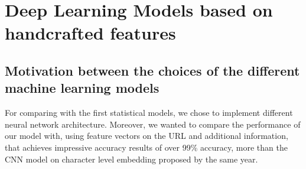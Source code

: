 \documentclass{article}
\begin{document}


    \section{Deep Learning Models based on handcrafted features}\label{sec:deep-learning-models}

    \subsection{Motivation between the choices of the different machine learning models}\label{subsec:motivation-between-the-choices-of-the-different-machine-learning-models}
    For comparing with the first statistical models, we chose to implement different neural network architecture.
    Moreover, we wanted to compare the performance of our model with\cite{EfficientDeepLearningPhishingDetection}, using feature vectors on the URL and additional information, that achieves impressive accuracy results of over 99\% accuracy, more than the CNN model on character level embedding proposed by\cite{CharacterLevelCNN} the same year.
\end{document}
